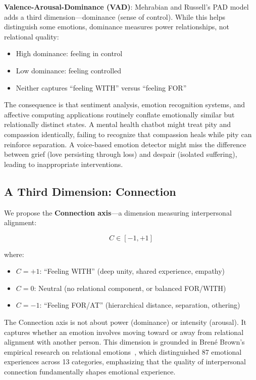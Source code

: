 \documentclass[10pt,twocolumn]{article}
\begin{document}
\textbf{Valence-Arousal-Dominance (VAD)}: Mehrabian and Russell's PAD model~\cite{mehrabian1974} adds a third dimension—dominance (sense of control). While this helps distinguish some emotions, dominance measures power relationships, not relational quality:
\begin{itemize}
    \item High dominance: feeling in control
    \item Low dominance: feeling controlled
    \item Neither captures ``feeling WITH'' versus ``feeling FOR''
\end{itemize}

The consequence is that sentiment analysis, emotion recognition systems, and affective computing applications routinely conflate emotionally similar but relationally distinct states. A mental health chatbot might treat pity and compassion identically, failing to recognize that compassion heals while pity can reinforce separation. A voice-based emotion detector might miss the difference between grief (love persisting through loss) and despair (isolated suffering), leading to inappropriate interventions.

\subsection{A Third Dimension: Connection}

We propose the \textbf{Connection axis}—a dimension measuring interpersonal alignment:

$$C \in [-1, +1]$$

where:
\begin{itemize}
    \item $C = +1$: ``Feeling WITH'' (deep unity, shared experience, empathy)
    \item $C = 0$: Neutral (no relational component, or balanced FOR/WITH)
    \item $C = -1$: ``Feeling FOR/AT'' (hierarchical distance, separation, othering)
\end{itemize}

The Connection axis is not about power (dominance) or intensity (arousal). It captures whether an emotion involves moving toward or away from relational alignment with another person. This dimension is grounded in Brené Brown's empirical research on relational emotions~\cite{brown2021}, which distinguished 87 emotional experiences across 13 categories, emphasizing that the quality of interpersonal connection fundamentally shapes emotional experience.
\end{document}
